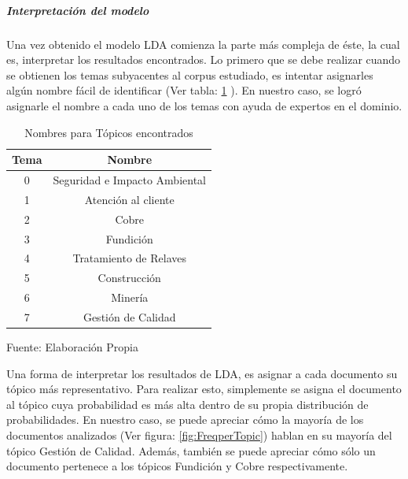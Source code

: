     \newpage
    
    \subparagraph{Interpretación del modelo}
    \subparagraph*{}
    Una vez obtenido el modelo LDA comienza la parte más compleja de éste, la cual es, interpretar los resultados encontrados. Lo primero que se debe realizar cuando se obtienen los temas subyacentes al corpus estudiado, es intentar asignarles algún nombre fácil de identificar (Ver tabla: \ref{table:Topics_Name} ). En nuestro caso, se logró asignarle el nombre a cada uno de los temas con ayuda de expertos en el dominio.
    
    \begin{table}[H]
    \centering
    \begin{tabular}{|c|c|}
    \hline
    \textbf{Tema} & \textbf{Nombre}               \\ \hline
    0             & Seguridad e Impacto Ambiental \\ \hline
    1             & Atención al cliente           \\ \hline
    2             & Cobre                          \\ \hline
    3             & Fundición                     \\ \hline
    4             & Tratamiento de Relaves        \\ \hline
    5             & Construcción        \\ \hline
    6             & Minería                              \\ \hline
    7             & Gestión de Calidad            \\ \hline
    \end{tabular}
    \caption{\label{table:Topics_Name} Nombres para Tópicos encontrados} Fuente: Elaboración Propia
    \end{table}
    
    Una forma de interpretar los resultados de LDA, es asignar a cada documento su tópico más representativo. Para realizar esto, simplemente se asigna el documento al tópico cuya probabilidad es más alta dentro de su propia distribución de probabilidades. En nuestro caso, se puede apreciar cómo la mayoría de los documentos analizados (Ver figura: \ref{fig:FreqperTopic}) hablan en su mayoría del tópico Gestión de Calidad. Además, también se puede apreciar cómo sólo un documento pertenece a los tópicos Fundición y Cobre respectivamente.
    
